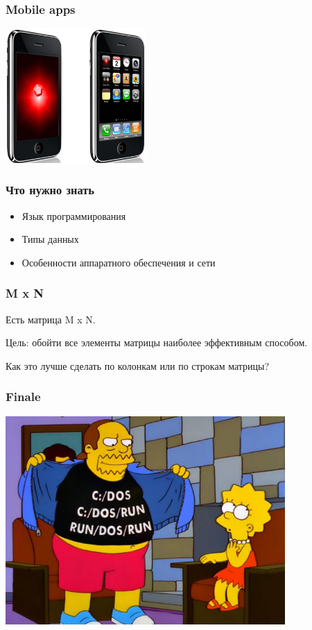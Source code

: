 \documentclass[10pt,pdf,hyperref={unicode}]{beamer}
\begin{document}
\begin{frame}
\frametitle{ Mobile apps }
	\center
	\includegraphics[width=0.4\textwidth]{./imrich.png}
\end{frame}

\begin{frame}
\frametitle{ Что нужно знать}

\begin{itemize}

	\item Язык программирования
	\item Типы данных
	\item  Особенности аппаратного обеспечения и сети

\end{itemize}

\end{frame}

\begin{frame}
\frametitle{ M x N }

\par
Есть матрица M x N. 

\par
Цель: обойти все элементы матрицы наиболее эффективным способом.

\par
Как это лучше сделать по колонкам или по строкам матрицы?

\end{frame}

\begin{frame}
\frametitle{ Finale }

\center
	\includegraphics[width=0.8\textwidth]{./run_dos_run.png}

\end{frame}
\end{document}
